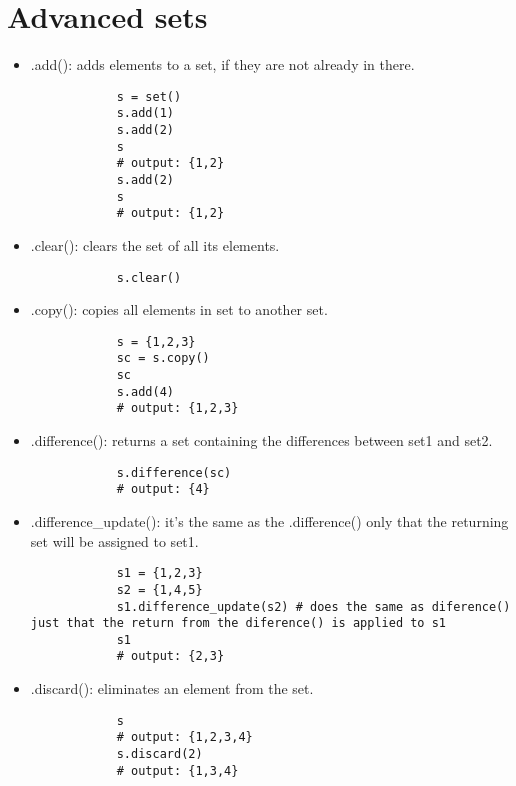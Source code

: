 \section{Advanced sets}
\begin{itemize}
    \item {}.add(): adds elements to a set, if they are not already in there. 
        \begin{verbatim}
            s = set()
            s.add(1)
            s.add(2)
            s
            # output: {1,2}
            s.add(2)
            s 
            # output: {1,2}
        \end{verbatim}
        
    \item {}.clear(): clears the set of all its elements. 
        \begin{verbatim}
            s.clear()
        \end{verbatim}
        
    \item {}.copy(): copies all elements in set to another set. 
        \begin{verbatim}
            s = {1,2,3}
            sc = s.copy()
            sc
            s.add(4)
            # output: {1,2,3}
        \end{verbatim}
        
    \item {}.difference(): returns a set containing the differences between set1 and set2.
        \begin{verbatim}
            s.difference(sc)
            # output: {4}
        \end{verbatim}
        
    \item {}.difference\_update(): it's the same as the .difference() only that the returning set will be assigned to set1.
        \begin{verbatim}
            s1 = {1,2,3}
            s2 = {1,4,5}
            s1.difference_update(s2) # does the same as diference() just that the return from the diference() is applied to s1
            s1 
            # output: {2,3}
        \end{verbatim}
        
    \item {}.discard(): eliminates an element from the set.
        \begin{verbatim}
            s
            # output: {1,2,3,4}
            s.discard(2)
            # output: {1,3,4}
        \end{verbatim}
        

\end{itemize}
